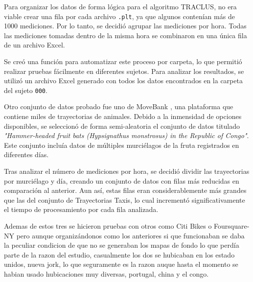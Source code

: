 Para organizar los datos de forma lógica para el algoritmo TRACLUS, no era viable crear una fila por cada archivo \texttt{.plt}, ya que algunos contenían más de 1000 mediciones. Por lo tanto, se decidió agrupar las mediciones por hora. Todas las mediciones tomadas dentro de la misma hora se combinaron en una única fila de un archivo Excel.

Se creó una función para automatizar este proceso por carpeta, lo que permitió realizar pruebas fácilmente en diferentes sujetos. Para analizar los resultados, se utilizó un archivo Excel generado con todos los datos encontrados en la carpeta del sujeto \texttt{000}.

Otro conjunto de datos probado fue uno de MoveBank \cite{movebank}, una plataforma que contiene miles de trayectorias de animales. Debido a la inmensidad de opciones disponibles, se seleccionó de forma semi-aleatoria el conjunto de datos titulado \textit{"Hammer-headed fruit bats (Hypsignathus monstrosus) in the Republic of Congo"}. Este conjunto incluía datos de múltiples murciélagos de la fruta registrados en diferentes días. 

Tras analizar el número de mediciones por hora, se decidió dividir las trayectorias por murciélago y día, creando un conjunto de datos con filas más reducidas en comparación al anterior. Aun así, estas filas eran considerablemente más grandes que las del conjunto de Trayectorias Taxis, lo cual incrementó significativamente el tiempo de procesamiento por cada fila analizada.

Ademas de estos tres se hicieron pruebas con otros como Citi Bikes \cite{} o Foursquare-NY \cite{} pero aunque organizándonos como los anteriores si que funcionaban se daba la peculiar condicion de que no se generaban los mapas de fondo lo que perdía parte de la razon del estudio, casualmente los dos se hubicaban en los estado unidos, nueva jork, lo que seguramente es la razon auque hasta el momento se habian usado hubicaciones muy diversas, portugal, china y el congo. 


